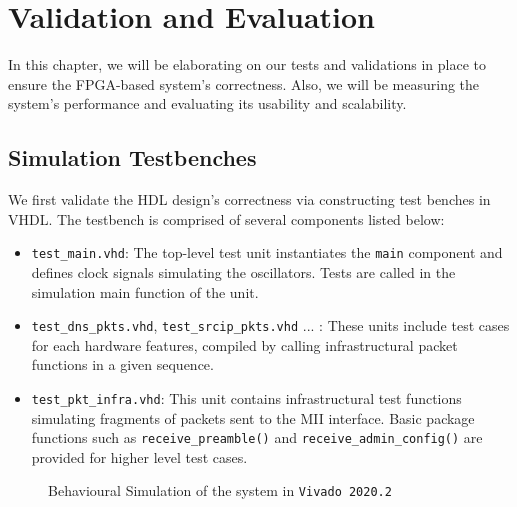 \documentclass[a4paper]{report}
\newcommand{\proglang}{\textsf}
\newcommand{\code}{\texttt}
\begin{document}
\chapter{Validation and Evaluation}

In this chapter, we will be elaborating on our tests and validations in place to ensure the FPGA-based system's correctness. Also, we will be measuring the system's performance and evaluating its usability and scalability. 

\section{Simulation Testbenches}
\label{section:validation-simulation}

We first validate the HDL design's correctness via constructing test benches in \proglang{VHDL}. The testbench is comprised of several components listed below:

\begin{itemize}
    \item \code{test\_main.vhd}: The top-level test unit instantiates the \code{main} component and defines clock signals simulating the oscillators. Tests are called in the simulation main function of the unit.
    \item \code{test\_dns\_pkts.vhd}, \code{test\_srcip\_pkts.vhd} ... : These units include test cases for each hardware features, compiled by calling infrastructural packet functions in a given sequence. 
    \item \code{test\_pkt\_infra.vhd}: This unit contains infrastructural test functions simulating fragments of packets sent to the MII interface. Basic package functions such as \code{receive\_preamble()} and \code{receive\_admin\_config()} are provided for higher level test cases.
\end{itemize}

\begin{figure}[h!]
  \caption{Behavioural Simulation of the system in \code{Vivado 2020.2}}
  \label{fig:behavioural-simulation-fpga}
\end{figure}
\end{document}
